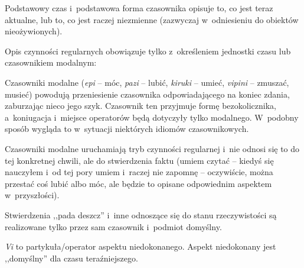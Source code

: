 \begin{spacing}{1.1}
\skipline

Podstawowy czas i~podstawowa forma czasownika opisuje to, co jest teraz 
aktualne, lub to, co jest raczej niezmienne (zazwyczaj w~odniesieniu do 
obiektów nieożywionych).


Opis czynności regularnych obowiązuje tylko z~określeniem jednostki czasu lub
 czasownikiem modalnym:




Czasowniki modalne (\emph{epi} -- móc, \emph{pazi} -- lubić, \emph{kiruki} -- 
umieć, \emph{vipini} -- zmuszać, musieć) powodują przeniesienie czasownika 
odpowiadającego na koniec zdania, zaburzając nieco jego szyk. Czasownik ten 
przyjmuje formę bezokolicznika, a~koniugacja i~miejsce operatorów będą dotyczyły
tylko modalnego. W~podobny sposób wygląda to w~sytuacji niektórych idiomów 
czasownikowych.



Czasowniki modalne uruchamiają tryb czynności regularnej i~nie odnosi się to do 
tej konkretnej chwili, ale do stwierdzenia faktu (umiem czytać -- kiedyś się 
nauczyłem i~od tej pory umiem i~raczej nie zapomnę -- oczywiście, można przestać
coś lubić albo móc, ale będzie to opisane odpowiednim aspektem w~przyszłości).

Stwierdzenia ,,pada deszcz'' i~inne odnoszące się do stanu rzeczywistości są 
realizowane tylko przez sam czasownik i~podmiot domyślny.



\emph{Vi} to partykuła/operator aspektu niedokonanego. Aspekt niedokonany jest 
,,domyślny'' dla czasu teraźniejszego.



\end{spacing}
